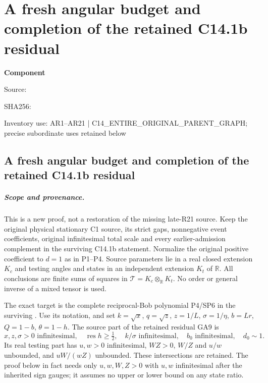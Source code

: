 \chapter{A fresh angular budget and completion of the retained C14.1b residual}
\label{component:p4e5ba027f187}
\noindent\textbf{Component }\par
{\small\noindent Source: \par}
{\small\noindent SHA256: \par}
{\small\noindent Inventory use: AR1--AR21 | C14\_\allowbreak{}ENTIRE\_\allowbreak{}ORIGINAL\_\allowbreak{}PARENT\_\allowbreak{}GRAPH; precise subordinate uses retained below\par}
\medskip
\section{A fresh angular budget and completion of the retained C14.1b residual}
\label{p4e5ba027f187:sec:c141b-residual-rederived}

\paragraph{Scope and provenance.}
This is a new proof, not a restoration of the missing late-R21 source.
Keep the original physical stationary C1 source, its strict gaps,
nonnegative event coefficients, original infinitesimal total scale and
every earlier-admission complement in the surviving C14.1b statement.
Normalize the original positive coefficient to $d=1$ as in P1--P4.
Source parameters lie in a real closed extension $K_c$ and testing
angles and states in an independent extension $K_t$ of $\mathbb R$.
All conclusions are finite sums of squares in
$\mathcal T=K_c\otimes_{\mathbb R}K_t$. No order or general inverse
of a mixed tensor is used.

The exact target is the complete reciprocal-Bob polynomial P4/SP6
in the surviving .
Use its notation, and set $k=\sqrt x$, $q=\sqrt z$, $z=1/L$,
$\sigma=1/\eta$, $b=Lr$, $Q=1-b$, $\theta=1-h$.
The source part of the retained residual GA9 is
\[
 x,z,\sigma>0\text{ infinitesimal},\quad
 \operatorname{res}h\ge\tfrac12,\quad k/\sigma\text{ infinitesimal},
 \quad b_0\text{ infinitesimal},\quad d_0\sim1.
 \tag{AR1}
\]
Its real testing part has $u,w>0$ infinitesimal, $WZ>0$,
$W/Z$ and $u/w$ unbounded, and $uW/(wZ)$ unbounded. These
intersections are retained. The proof below in fact needs only
$u,w,W,Z>0$ with $u,w$ infinitesimal after the inherited sign
gauges; it assumes no upper or lower bound on any state ratio.


